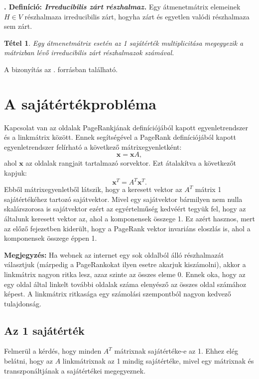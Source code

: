\documentclass[12pt,a4paper]{article}
\newcounter{definicioszam}
\newenvironment{definicio}[1]
{{\medskip}\noindent \stepcounter{definicioszam}
{\bfseries{\thedefinicioszam. Definíció: \textit{#1.}}}}{\bigskip }
\newcommand{\bx}{\mathbf{x}}
\newtheorem{tetel}{Tétel}
\begin{document}
\begin{definicio}{Irreducibilis zárt részhalmaz}
	Egy átmenetmátrix elemeinek $H \in V$ részhalmaza irreducibilis zárt, hogyha zárt és egyetlen valódi részhalmaza sem zárt.
\end{definicio}

\begin{tetel}
	Egy átmenetmátrix esetén az 1 sajátérték multiplicitása megegyezik a mátrixban lévő irreducibilis zárt részhalmazok számával.
\end{tetel}
\noindent
A bizonyítás az \cite{irreducible_closed}. forrásban található.

\section{A sajátértékprobléma}

Kapcsolat van az oldalak PageRankjának definíciójából kapott egyenletrendszer és a linkmátrix között. Ennek segítségével a PageRank definíciójából kapott egyenletrendszer felírható a következő mátrixegyenletként:
\[ 
\bx = \bx A, 
\]
ahol $\bx$ az oldalak rangjait tartalmazó sorvektor. Ezt átalakítva a következőt kapjuk:
\[
\bx^T = A^T \bx^T. 
\]
Ebből mátrixegyenletből látszik, hogy a keresett vektor az $A^T$ mátrix 1 sajátértékéhez 
tartozó sajátvektor. Mivel egy sajátvektor bármilyen nem nulla skalárszorosa is 
sajátvektor ezért az egyértelműség kedvéért tegyük fel, hogy az általunk keresett vektor 
az, ahol a komponensek összege 1. Ez azért hasznos, mert az előző fejezetben kiderült, 
hogy a PageRank vektor invariáns eloszlás is, ahol a komponensek összege éppen 1.

\vspace{0.1cm}
\textbf{Megjegyzés:} Ha webnek az internet egy sok oldalból álló részhalmazát választjuk (márpedig a PageRankokat ilyen esetre akarjuk kiszámolni), akkor a linkmátrix nagyon ritka lesz, azaz szinte az összes eleme 0. Ennek oka, hogy az egy oldal által linkelt további oldalak száma elenyésző az összes oldal számához képest. A linkmátrix ritkasága egy számolási szempontból nagyon kedvező tulajdonság. 

\subsection{Az 1 sajátérték}\label{egy_sajatertek}

Felmerül a kérdés, hogy minden $A^T$ mátrixnak sajátértéke-e az 1. Ehhez elég belátni, hogy az $A$ linkmátrixnak az 1 mindig sajátértéke, mivel egy mátrixnak és transzponáltjának a sajátértékei megegyeznek.
\end{document}
